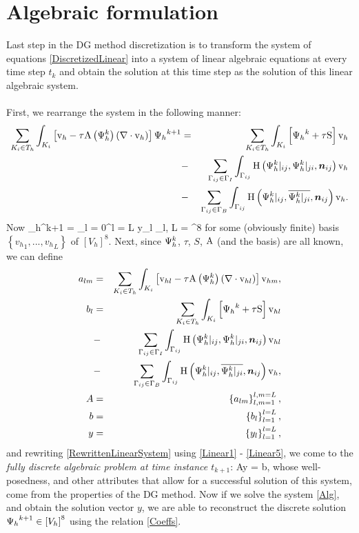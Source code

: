 \section{Algebraic formulation}
Last step in the DG method discretization is to transform the system of equations \ref{DiscretizedLinear} into a system of linear algebraic equations at every time step $t_k$ and obtain the solution at this time step as the solution of this linear algebraic system.
\paragraph{}
First, we rearrange the system in the following manner:
\begin{eqnarray}
\label{RewrittenLinearSystem} \sum_{K_i \in T_h}\int_{K_i} \left[\mathrm{v}_h - \tau\mathrm{A}\left({\mathrm{\Psi}_h^{k}}\right) \left(\nabla \cdot \mathrm{v}_h\right)\right] {\mathrm{\Psi}_h}^{k+1} & = &
\sum_{K_i \in T_h}\int_{K_i} \left[{\mathrm{\Psi}_h}^{k} + \tau\mathrm{S}\right] \mathrm{v}_h \\\nonumber& - &\sum_{\Gamma_{ij}\in\Gamma_I} \int_{\Gamma_{ij}}\mathrm{H}\left({\mathrm{\Psi}_h^{k}}|_{ij}, {\mathrm{\Psi}_h^{k}}|_{ji}, \mbox{\boldmath $n$}_{ij}\right) \mathrm{v}_h
\\\nonumber& - &\sum_{\Gamma_{ij}\in\Gamma_B} \int_{\Gamma_{ij}} \mathrm{H}\left({\mathrm{\Psi}_h^{k}}|_{ij}, \overline{{\mathrm{\Psi}_h^{k}}|_{ji}}, \mbox{\boldmath $n$}_{ij}\right) \mathrm{v}_h.
\end{eqnarray}
Now
\be
\label{Coeffs} {\mrPsi_h}^{k+1} = \sum_{l = 0}^{l = L} y_l {\mrvh}_l, L = \lo\left[V_h\right]^8\ro
\ee
for some (obviously finite) basis $\left\{{v_h}_1, ..., {v_h}_L\right\}$ of $\left[V_h\right]^8$.
Next, since $\mathrm{\Psi}_h^{k}$, $\tau$, $S$, $\mathrm{A}$ (and the basis) are all known, we can define
\begin{eqnarray}
\label{Linear1}
a_{lm} & = & \sum_{K_i \in T_h}\int_{K_i} \left[\mathrm{v}_{hl} - \tau\mathrm{A}\left({\mathrm{\Psi}_h^{k}}\right) \left(\nabla \cdot \mathrm{v}_{hl}\right)\right] \mathrm{v}_{hm}, \\
b_{l} & = & \sum_{K_i \in T_h}\int_{K_i} \left[{\mathrm{\Psi}_h}^{k} + \tau\mathrm{S}\right] \mathrm{v}_{hl}\\\nonumber & - &\sum_{\Gamma_{ij}\in\Gamma_I} \int_{\Gamma_{ij}}\mathrm{H}\left({\mathrm{\Psi}_h^{k}}|_{ij}, {\mathrm{\Psi}_h^{k}}|_{ji}, \mbox{\boldmath $n$}_{ij}\right) \mathrm{v}_{hl}\\\nonumber& - &
\sum_{\Gamma_{ij}\in\Gamma_B} \int_{\Gamma_{ij}} \mathrm{H}\left({\mathrm{\Psi}_h^{k}}|_{ij}, \overline{{\mathrm{\Psi}_h^{k}}|_{ji}}, \mbox{\boldmath $n$}_{ij}\right) \mathrm{v}_h,\\
A & = & \left\{a_{lm}\right\}_{l,m = 1}^{l,m = L},\\
b & = & \left\{b_{l}\right\}_{l = 1}^{l = L},\\
y & = & \left\{y_{l}\right\}_{l = 1}^{l = L},
\label{Linear5}
\end{eqnarray}
and rewriting \ref{RewrittenLinearSystem} using \ref{Linear1} - \ref{Linear5}, we come to the \textit{fully discrete algebraic problem at time instance $t_{k+1}$}:
\be
\label{Alg} Ay = b,
\ee
whose well-posedness, and other attributes that allow for a successful solution of this system, come from the properties of the DG method.
Now if we solve the system \ref{Alg}, and obtain the solution vector $y$, we are able to reconstruct the discrete solution ${\mathrm{\Psi}_h}^{k+1} \in \left[V_h\right]^8$ using the relation \ref{Coeffs}.